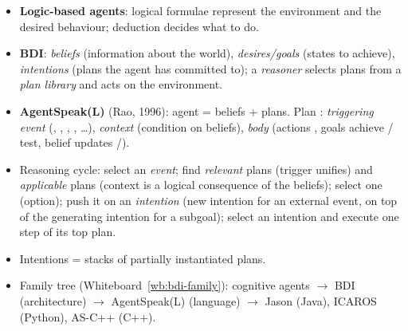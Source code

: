 \begin{nbsummary}
\begin{itemize}[nosep]
  \item \textbf{Logic-based agents}: logical formulae represent the environment and the
        desired behaviour; deduction decides what to do.
  \item \textbf{BDI}: \emph{beliefs} (information about the world), \emph{desires/goals}
        (states to achieve), \emph{intentions} (plans the agent has committed to); a
        \emph{reasoner} selects plans from a \emph{plan library} and acts on the environment.
  \item \textbf{AgentSpeak(L)} (Rao, 1996): agent = beliefs + plans. Plan
        : \emph{triggering event} (, , ,
        , \ldots), \emph{context} (condition on beliefs), \emph{body} (actions
        , goals  achieve /  test, belief updates /).
  \item Reasoning cycle: select an \emph{event}; find \emph{relevant} plans (trigger
        unifies) and \emph{applicable} plans (context is a logical consequence of the
        beliefs); select one (option); push it on an \emph{intention} (new intention for an
        external event, on top of the generating intention for a subgoal); select an
        intention and execute one step of its top plan.
  \item Intentions = stacks of partially instantiated plans.
  \item Family tree (Whiteboard~\ref{wb:bdi-family}): cognitive agents $\to$ BDI
        (architecture) $\to$ AgentSpeak(L) (language) $\to$ Jason (Java), ICAROS (Python),
        AS-C++ (C++).
\end{itemize}
\end{nbsummary}
